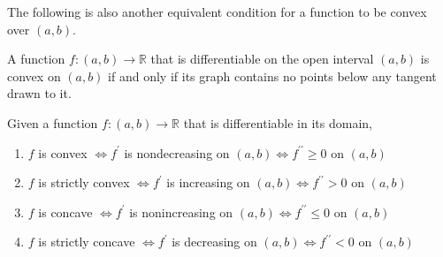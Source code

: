   The following is also another equivalent condition for a function to be convex over $(a, b)$. 

  \begin{theorem}
    A function $f: (a, b) \longrightarrow \mathbb{R}$ that is differentiable on the open interval $(a, b)$ is convex on $(a, b)$ if and only if its graph contains no points below any tangent drawn to it.
  \end{theorem}

  \begin{theorem}
    Given a function $f: (a, b) \longrightarrow \mathbb{R}$ that is differentiable in its domain, 
    \begin{enumerate}
      \item $f$ is convex $\iff f^\prime$ is nondecreasing on $(a, b) \iff f^{\prime\prime} \geq 0$ on $(a, b)$ 
      \item $f$ is strictly convex $\iff f^\prime$ is increasing on $(a, b) \iff f^{\prime\prime} > 0$ on $(a, b)$ 
      \item $f$ is concave $\iff f^\prime$ is nonincreasing on $(a, b) \iff f^{\prime\prime} \leq 0$ on $(a, b)$ 
      \item $f$ is strictly concave $\iff f^\prime$ is decreasing on $(a, b) \iff f^{\prime\prime} < 0$ on $(a, b)$ 
    \end{enumerate}
  \end{theorem}

